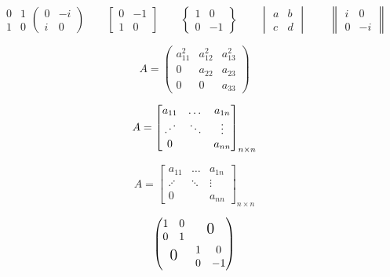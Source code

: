 \documentclass{ctexart}%
\newcommand{\adots}{\mathinner{\mkern2mu%
		\raisebox{0.1em}{.}\mkern2mu\raisebox{0.4em}{.}%
		\mkern2mu\raisebox{0.7em}{.}\mkern1mu}}
\begin{document}
	\[
	\begin{matrix}
		0 & 1 \\
		1 & 0
	\end{matrix}
	\begin{pmatrix}
		0 & -i\\
		i & 0
	\end{pmatrix} \qquad
	\begin{bmatrix}
		0 &-1 \\
		1 & 0
	\end{bmatrix} \qquad
	\begin{Bmatrix}
		1 &0\\
		0 &-1
	\end{Bmatrix} \qquad
	\begin{vmatrix}
		a&b\\
		c&d
	\end{vmatrix} \qquad
	\begin{Vmatrix}
		i &0\\
		0 &-i
	\end{Vmatrix}
	\]
	
	\[
	A =\begin{pmatrix}
		a_ {11}^2 & a_ {12}^2 & a_ {13}^2 \\
		0 & a_{22} & a_{23}\\
		0 & 0 & a_{33}
	\end{pmatrix}
	\]
	
	\[
	A = \begin{bmatrix}
		a_{11} & \dots & a_{1n}\\
		\adots & \ddots & \vdots \\
		0 & & a_{nn}
	\end{bmatrix}_ {n \times n}
	\]
	
	\[
	A = \begin{bmatrix}
		a_{11} & \dots & a_{1n}\\
		\iddots & \ddots & \vdots \\
		0 & & a_{nn}
	\end{bmatrix}_ {n \times n}
	\]
	
	\[
	\begin{pmatrix}
		\begin{matrix} 1&0\\0&1 \end{matrix}
		& \text{\Large 0} \\
		\text{\Large 0} & \begin{matrix}
			1&0\\0&-1 \end{matrix}
	\end{pmatrix}
	\]
	
\end{document}

